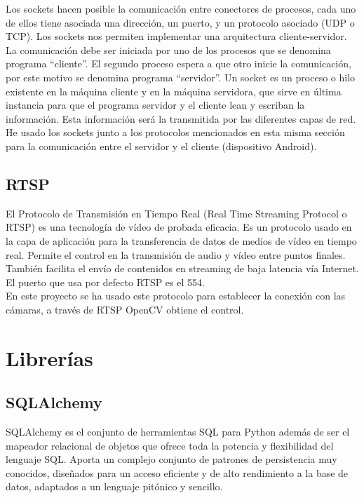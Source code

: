 Los sockets hacen posible la comunicación entre conectores de procesos, cada uno de ellos tiene asociada una dirección, un puerto, y un protocolo asociado (UDP o TCP). Los sockets nos permiten implementar una arquitectura cliente-servidor. La comunicación debe ser iniciada por uno de los procesos que se denomina programa ``cliente''. El segundo proceso espera a que otro inicie la comunicación, por este motivo se denomina programa ``servidor''. Un socket es un proceso o hilo existente en la máquina cliente y en la máquina servidora, que sirve en última instancia para que el programa servidor y el cliente lean y escriban la información. Esta información será la transmitida por las diferentes capas de red.\\
He usado los sockets junto a los protocolos mencionados en esta misma sección para la comunicación entre el servidor y el cliente (dispositivo Android).

\subsection{RTSP}

El Protocolo de Transmisión en Tiempo Real (Real Time Streaming Protocol o RTSP) es una tecnología de vídeo de probada eficacia. Es un protocolo usado en la capa de aplicación para la transferencia de datos de medios de vídeo en tiempo real. Permite el control en la transmisión de audio y vídeo entre puntos finales. También facilita el envío de contenidos en streaming de baja latencia vía Internet. El puerto que usa por defecto RTSP es el 554.\\
En este proyecto se ha usado este protocolo para establecer la conexión con las cámaras, a través de RTSP OpenCV obtiene el control.



\section{Librerías}

\subsection{SQLAlchemy}

SQLAlchemy es el conjunto de herramientas SQL para Python además de ser el mapeador relacional de objetos que ofrece toda la potencia y flexibilidad del lenguaje SQL. Aporta un complejo conjunto de patrones de persistencia muy conocidos, diseñados para un acceso eficiente y de alto rendimiento a la base de datos, adaptados a un lenguaje pitónico y sencillo.

